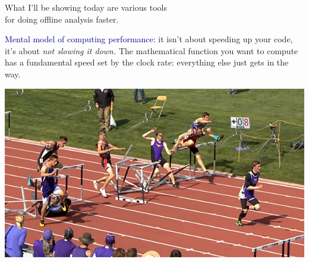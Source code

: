 \documentclass[aspectratio=169]{beamer}
\begin{document}
\begin{frame}{}
\begin{center}
\LARGE What I'll be showing today are various tools \\ for doing offline analysis faster.
\end{center}
\end{frame}

\begin{frame}{}
\vspace{1.2 cm}
\textcolor{darkblue}{Mental model of computing performance:} it isn't about speeding up your code, it's about {\it not slowing it down.} The mathematical function you want to compute has a fundamental speed set by the clock rate: everything else just gets in the way.

\begin{center}
\includegraphics[width=0.7\linewidth]{hurdle9.jpg}
\end{center}
\end{frame}
\end{document}

